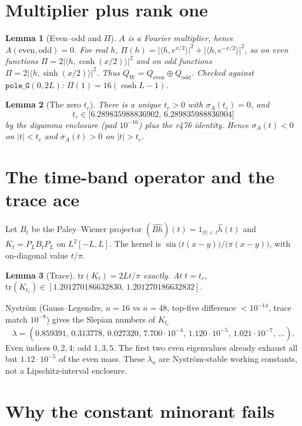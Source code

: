 \documentclass[11pt]{article}
\newtheorem{lemma}{Lemma}
\theoremstyle{remark}
\newcommand{\QW}{Q_{\mathrm W}}
\begin{document}
\section{Multiplier plus rank one}

\begin{lemma}[Even--odd and $\Pi$]\label{lem:pi}
$A$ is a Fourier multiplier, hence
$A(\mathrm{even},\mathrm{odd})=0$.
For real $h$,
$\Pi(h)=\bigl|\langle h,e^{x/2}\rangle\bigr|^2
+\bigl|\langle h,e^{-x/2}\rangle\bigr|^2$,
so on even functions
$\Pi=2\bigl|\langle h,\cosh(x/2)\rangle\bigr|^2$
and on odd functions
$\Pi=2\bigl|\langle h,\sinh(x/2)\rangle\bigr|^2$.
Thus $\QW=Q_{\mathrm{even}}\oplus Q_{\mathrm{odd}}$.
Checked against $\mathtt{pole\_G}(0,2L)$: $\Pi(1)=16(\cosh L-1)$.
\end{lemma}

\begin{lemma}[The zero $t_c$]\label{lem:tc}
There is a unique $t_c>0$ with $\sigma_A(t_c)=0$, and
\[
 t_c\in\bigl[6.289835988836902,\,6.289835988836904\bigr]
\]
by the digamma enclosure (pad $10^{-16}$) plus the r476 identity.
Hence $\sigma_A(t)<0$ on $|t|<t_c$ and $\sigma_A(t)>0$ on $|t|>t_c$.
\end{lemma}

\section{The time-band operator and the trace ace}

Let $B_{t}$ be the Paley--Wiener projector
$(\widehat{Bh})(t)=1_{|t|<t}\hat h(t)$ and
$K_t=P_LB_tP_L$ on $L^2[-L,L]$.
The kernel is $\sin\bigl(t(x-y)\bigr)/\bigl(\pi(x-y)\bigr)$,
with on-diagonal value $t/\pi$.

\begin{lemma}[Trace]\label{lem:tr}
$\mathrm{tr}(K_t)=2Lt/\pi$ exactly.
At $t=t_c$,
$\mathrm{tr}(K_{t_c})\in[1.201270186632830,\,1.201270186632832]$.
\end{lemma}

Nystr\"om (Gauss--Legendre, $n=16$ vs $n=48$, top-five
difference $<10^{-14}$, trace match $10^{-8}$) gives the
Slepian numbers of $K_{t_c}$
\[
 \lambda=(0.859391,\,0.313778,\,0.027320,\,7.700\cdot10^{-4},\,
 1.120\cdot10^{-5},\,1.021\cdot10^{-7},\,\dots).
\]
Even indices $0,2,4$; odd $1,3,5$.  The first two even
eigenvalues already exhaust all but $1.12\cdot10^{-5}$ of the
even mass.  These $\lambda_n$ are Nystr\"om-stable working
constants, not a Lipschitz-interval enclosure.

\section{Why the constant minorant fails}
\end{document}
